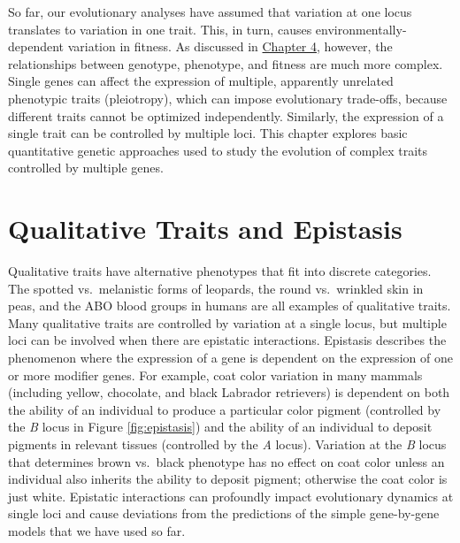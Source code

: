\documentclass[
]{book}
\begin{document}
So far, our evolutionary analyses have assumed that variation at one locus translates to variation in one trait. This, in turn, causes environmentally-dependent variation in fitness. As discussed in \href{the-raw-materials-for-evolution.html\#the-genotype-phenotype-gap}{Chapter 4}, however, the relationships between genotype, phenotype, and fitness are much more complex. Single genes can affect the expression of multiple, apparently unrelated phenotypic traits (pleiotropy), which can impose evolutionary trade-offs, because different traits cannot be optimized independently. Similarly, the expression of a single trait can be controlled by multiple loci. This chapter explores basic quantitative genetic approaches used to study the evolution of complex traits controlled by multiple genes.

\hypertarget{qualitative-traits-and-epistasis}{%
\section{Qualitative Traits and Epistasis}\label{qualitative-traits-and-epistasis}}

Qualitative traits have alternative phenotypes that fit into discrete categories. The spotted vs.~melanistic forms of leopards, the round vs.~wrinkled skin in peas, and the ABO blood groups in humans are all examples of qualitative traits. Many qualitative traits are controlled by variation at a single locus, but multiple loci can be involved when there are epistatic interactions. Epistasis describes the phenomenon where the expression of a gene is dependent on the expression of one or more modifier genes. For example, coat color variation in many mammals (including yellow, chocolate, and black Labrador retrievers) is dependent on both the ability of an individual to produce a particular color pigment (controlled by the \emph{B} locus in Figure \ref{fig:epistasis}) and the ability of an individual to deposit pigments in relevant tissues (controlled by the \emph{A} locus). Variation at the \emph{B} locus that determines brown vs.~black phenotype has no effect on coat color unless an individual also inherits the ability to deposit pigment; otherwise the coat color is just white. Epistatic interactions can profoundly impact evolutionary dynamics at single loci and cause deviations from the predictions of the simple gene-by-gene models that we have used so far.
\end{document}
